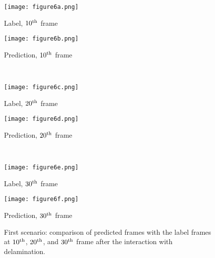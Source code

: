 \documentclass[sn-mathphys-num]{sn-jnl}%
\begin{document}
\begin{figure}
	\centering
	\begin{minipage}[b]{0.44\textwidth}
		\centering
		\texttt{[image: figure6a.png]}
		\caption*{Label, $10\textsuperscript{th}$ frame}
		\label{fig:num_415_label1}
	\end{minipage}
	\hfill
	\begin{minipage}[b]{0.44\textwidth}
		\centering
		\texttt{[image: figure6b.png]}
		\caption*{Prediction, $10\textsuperscript{th}$ frame}
		\label{fig:num_415_pred1}
	\end{minipage}
	\\
	\begin{minipage}[b]{0.44\textwidth}
		\centering
		\texttt{[image: figure6c.png]}
		\caption*{Label, $20\textsuperscript{th}$ frame}
		\label{fig:num_415_label2}
	\end{minipage}
	\hfill
	\begin{minipage}[b]{0.44\textwidth}
		\centering
		\texttt{[image: figure6d.png]}
		\caption*{Prediction, $20\textsuperscript{th}$ frame}
		\label{fig:num_415_pred2}
	\end{minipage}
	\\
	\begin{minipage}[b]{0.44\textwidth}
		\centering
		\texttt{[image: figure6e.png]}
		\caption*{Label, $30\textsuperscript{th}$ frame}
		\label{fig:num_415_label3}
	\end{minipage}
	\hfill
	\begin{minipage}[b]{0.44\textwidth}
		\centering
		\texttt{[image: figure6f.png]}
		\caption*{Prediction, $30\textsuperscript{th}$ frame}
		\label{fig:num_415_pred3}
	\end{minipage}
	\caption{First scenario: comparison of predicted frames with the label 
	frames at $10\textsuperscript{th}$, $20\textsuperscript{th}$, and 
	$30\textsuperscript{th}$ frame after the interaction with delamination.}
	\label{fig:num_415}
\end{figure}
\end{document}

